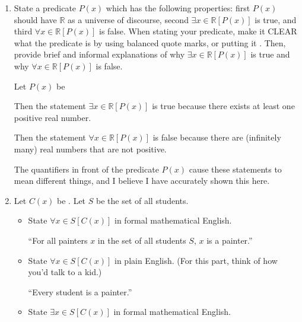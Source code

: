 \documentclass{article}
\begin{document}

\begin{enumerate}

      \item State a predicate $P(x)$ which has the following properties: first $P(x)$
            should have $\mathbb{R}$ as a universe of discourse, second $\exists x \in
                  \mathbb{R} [P(x)]$ is true, and third $\forall x \in \mathbb{R} [P(x)]$ is
            false. When stating your predicate, make it CLEAR what the predicate is by
            using balanced quote marks, or putting it .
            Then, provide brief and informal explanations of why $\exists x \in \mathbb{R}
                  [P(x)]$ is true and why $\forall x \in \mathbb{R} [P(x)]$ is false.

            Let $P(x)$ be 

            Then the statement $\exists x \in \mathbb{R} [P(x)]$ is true because there
            exists at least one positive real number.

            Then the statement $\forall x \in \mathbb{R} [P(x)]$ is false because there are
            (infinitely many) real numbers that are not positive.

            The quantifiers in front of the predicate $P(x)$ cause these statements to mean
            different things, and I believe I have accurately shown this here.

            \newpage

      \item Let $C(x)$ be . Let $S$ be the set of all students.
            \begin{itemize}
                  \item State $\forall x \in S [C(x)]$ in formal mathematical English.

                        ``For all painters $x$ in the set of all students $S$, $x$ is a painter.''

                  \item State $\forall x \in S [C(x)]$ in plain English. (For this part, think of how
                        you'd talk to a kid.)

                        ``Every student is a painter.''

                  \item State $\exists x \in S [C(x)]$ in formal mathematical English.


\end{itemize}
\end{enumerate}
\end{document}
